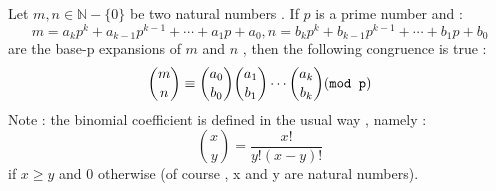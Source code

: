 \documentclass[12pt]{article}
\begin{document}
Let $m,n \in \mathbb{N}-\{0\}$ be two natural numbers . If $p$ is a prime number and :
$$ m = a_k p^k + a_{k-1} p^{k-1} + \cdots + a_1 p + a_0 , n = b_k p^k + b_{k-1} p^{k-1} + \cdots + b_1 p + b_0$$ are the base-p expansions of $m$ and $n$ , then the following congruence is true :
$$ {m \choose n} \equiv {a_0 \choose b_0} {a_1 \choose b_1} \cdots {a_k \choose b_k} (\verb|mod p|)$$
Note : the binomial coefficient is defined in the usual way , namely :
$$ {x \choose y} = \frac{x!}{y!(x-y)!} $$ if $x \geq y$ and $0$ otherwise (of course , x and y are natural numbers).
\end{document}
